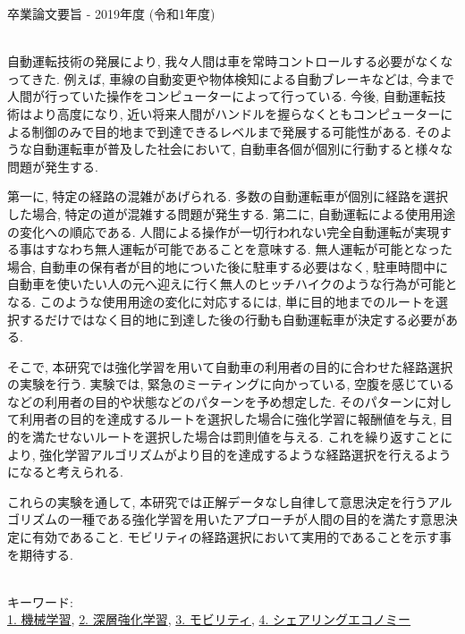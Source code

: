 卒業論文要旨 - 2019年度 (令和1年度)
\begin{center}
\begin{large}
\end{large}
\end{center}

~ \\

自動運転技術の発展により, 我々人間は車を常時コントロールする必要がなくなってきた.
例えば, 車線の自動変更や物体検知による自動ブレーキなどは, 今まで人間が行っていた操作をコンピューターによって行っている.
今後, 自動運転技術はより高度になり, 近い将来人間がハンドルを握らなくともコンピューターによる制御のみで目的地まで到達できるレベルまで発展する可能性がある.
そのような自動運転車が普及した社会において, 自動車各個が個別に行動すると様々な問題が発生する.

第一に, 特定の経路の混雑があげられる.
多数の自動運転車が個別に経路を選択した場合, 特定の道が混雑する問題が発生する.
第二に, 自動運転による使用用途の変化への順応である. 人間による操作が一切行われない完全自動運転が実現する事はすなわち無人運転が可能であることを意味する.
無人運転が可能となった場合, 自動車の保有者が目的地についた後に駐車する必要はなく, 駐車時間中に自動車を使いたい人の元へ迎えに行く無人のヒッチハイクのような行為が可能となる.
このような使用用途の変化に対応するには, 単に目的地までのルートを選択するだけではなく目的地に到達した後の行動も自動運転車が決定する必要がある.

そこで, 本研究では強化学習を用いて自動車の利用者の目的に合わせた経路選択の実験を行う.
実験では, 緊急のミーティングに向かっている, 空腹を感じているなどの利用者の目的や状態などのパターンを予め想定した. そのパターンに対して利用者の目的を達成するルートを選択した場合に強化学習に報酬値を与え, 目的を満たせないルートを選択した場合は罰則値を与える.
これを繰り返すことにより, 強化学習アルゴリズムがより目的を達成するような経路選択を行えるようになると考えられる.

これらの実験を通して, 本研究では正解データなし自律して意思決定を行うアルゴリズムの一種である強化学習を用いたアプローチが人間の目的を満たす意思決定に有効であること. モビリティの経路選択において実用的であることを示す事を期待する.

~ \\
キーワード:\\
\underline{1. 機械学習},
\underline{2. 深層強化学習},
\underline{3. モビリティ},
\underline{4. シェアリングエコノミー}
\begin{flushright}
\dept \\
\author
\end{flushright}
